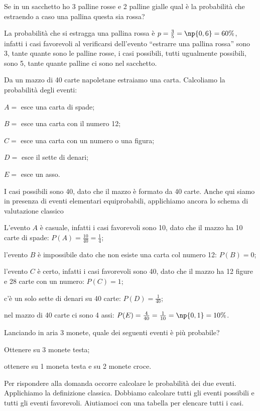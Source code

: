 \begin{exrig}
\begin{esempio}
Se in un sacchetto ho 3 palline rosse e 2 palline gialle qual è la probabilità che estraendo a caso una pallina questa sia rossa?

La probabilità che si estragga una pallina rossa è $p=\frac 3 5=\np{0,6}=60\text{\%}$, infatti i casi favorevoli al verificarsi dell'evento ``estrarre una pallina rossa'' sono 3, tante quante sono le palline rosse, i casi possibili, tutti ugualmente possibili, sono 5, tante quante palline ci sono nel sacchetto.
\end{esempio}

\begin{esempio}
Da un mazzo di 40 carte napoletane estraiamo una carta. Calcoliamo la probabilità degli eventi:
\begin{description*}
\item $A=$ esce una carta di spade;
\item $B=$ esce una carta con il numero 12;
\item $C=$ esce una carta con un numero o una figura;
\item $D=$ esce il sette di denari;
\item $E=$ esce un asso.
\end{description*}
I casi possibili sono 40, dato che il mazzo è formato da 40 carte. Anche qui siamo in presenza di eventi elementari equiprobabili, applichiamo ancora lo schema di valutazione classico
\begin{itemize*}
\item L'evento $A$ è casuale, infatti i casi favorevoli sono 10, dato che il mazzo ha 10 carte di spade: $P(A)=\frac{10}{40}=\frac 1 4$;
\item l'evento $B$ è impossibile dato che non esiste una carta col numero 12: $P(B)=0$;
\item l'evento $C$ è certo, infatti i casi favorevoli sono 40, dato che il mazzo ha 12 figure e 28 carte con un numero: $P(C)=1$;
\item c'è un solo sette di denari su 40 carte: $P(D)=\frac 1{40}$;
\item nel mazzo di 40 carte ci sono 4 assi: $P(E)=\frac 4{40}=\frac 1{10}=\np{0,1}=10\%$.
\end{itemize*}
\end{esempio}

\begin{esempio}
Lanciando in aria 3 monete, quale dei seguenti eventi è più probabile?
\begin{itemize*}
\item Ottenere su 3 monete testa;
\item ottenere su 1 moneta testa e su 2 monete croce.
\end{itemize*}
Per rispondere alla domanda occorre calcolare le probabilità dei due eventi. Applichiamo la definizione classica. Dobbiamo calcolare tutti gli eventi possibili e tutti gli eventi favorevoli.
Aiutiamoci con una tabella per elencare tutti i casi.


\end{esempio}
\end{exrig}
